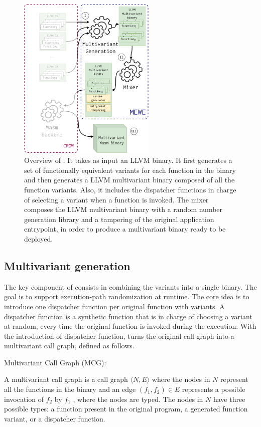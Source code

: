 \begin{figure}
  \centering
  \includegraphics[height=3.1in]{diagrams/MEWE.pdf}
  \caption{Overview of \tool. It takes as input an LLVM binary. It first generates a set of functionally equivalent variants for each function in the binary and then generates a LLVM multivariant binary composed of all the function variants. Also, it includes the dispatcher functions in charge of selecting a variant when a function is invoked. The \tool mixer composes the LLVM multivariant binary with a random number generation library and a tampering of the original application entrypoint, in order to produce a \wasm multivariant binary ready to be deployed. }
  \label{workflow}
\end{figure}


\subsection*{Multivariant generation}

The key component of \tool consists in combining the variants into a single binary.
The goal is to support execution-path randomization at runtime.
The core idea is to introduce one dispatcher function per original function with variants.
A dispatcher function is a synthetic function that is in charge of choosing a variant at random, every time the original function is invoked during the execution.
With the introduction of dispatcher function,  \tool turns the original call graph into a multivariant call graph, defined as follows. 

\begin{definition}{Multivariant Call Graph (MCG):}\label{def:EP}
  
    A multivariant call graph is a call graph $\langle N,E \rangle$ where the nodes in $N$ represent all the functions in the binary and an edge $(f_1,f_2) \in E$ represents a possible invocation of $f_2$ by $f_1$  \cite{ryder1979}, where the nodes are typed. The nodes in $N$ have three possible types: a function present in the original program,  a generated function variant, or a dispatcher function.
\end{definition}


